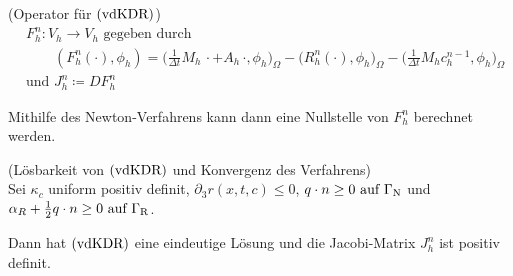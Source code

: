 \begin{define}(Operator für $ \operatorname{(vdKDR)} $)
	\begin{align*}
		&F_h^n: V_h \to V_h \text{ gegeben durch }\\ & \qquad (F_h^n( \cdot ), \phi_h) = \bigg( \frac{1}{\Delta t} M_h \, \cdot + A_h \, \cdot, \phi_h  \bigg)_\Omega - \bigg( R_h^n( \cdot ), \phi_h \bigg)_\Omega - \bigg( \frac{1}{\Delta t} M_h c_h^{n-1}, \phi_h \bigg)_\Omega \\
		&\text{und } J_h^n \coloneqq D F_h^n
	\end{align*} 
\end{define}
Mithilfe des Newton-Verfahrens kann dann eine Nullstelle von $F_h^n$ berechnet werden.

\begin{Satz}(Lösbarkeit von $ \operatorname{(vdKDR)} $ und Konvergenz des Verfahrens)\\
Sei $ \kappa_c $ uniform positiv definit, $ \partial_3 r(x,t,c) \le 0 $, $ q \cdot n \ge 0 \text{ auf } \Gamma_{\text{N}} $ und $ \alpha_R + \frac{1}{2} q \cdot n \ge 0 \text{ auf } \Gamma_{\text{R}} $.

Dann hat $ \operatorname{(vdKDR)} $ eine eindeutige Lösung und die Jacobi-Matrix $ J_h^n $ ist positiv definit.

\end{Satz}


